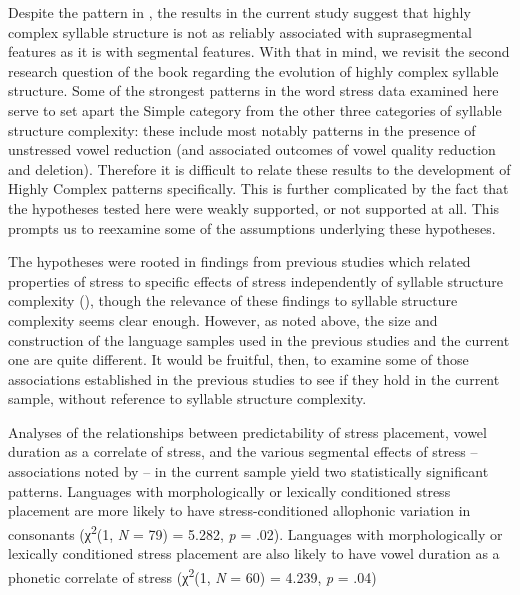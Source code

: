   Despite the pattern in , the results in the current study suggest that highly complex syllable structure is not as reliably associated with suprasegmental features as it is with segmental features. With that in mind, we revisit the second research question of the book regarding the evolution of highly complex syllable structure. Some of the strongest patterns in the word stress data examined here serve to set apart the Simple category from the other three categories of syllable structure complexity: these include most notably patterns in the presence of unstressed vowel reduction (and associated outcomes of vowel quality reduction and deletion). Therefore it is difficult to relate these results to the development of Highly Complex patterns specifically. This is further complicated by the fact that the hypotheses tested here were weakly supported, or not supported at all. This prompts us to reexamine some of the assumptions underlying these hypotheses.

  The hypotheses were rooted in findings from previous studies which related properties of stress to specific effects of stress independently of syllable structure complexity (\citealt{BybeeEtAl1998,Schiering2007}), though the relevance of these findings to syllable structure complexity seems clear enough. However, as noted above, the size and construction of the language samples used in the previous studies and the current one are quite different. It would be fruitful, then, to examine some of those associations established in the previous studies to see if they hold in the current sample, without reference to syllable structure complexity.

  Analyses of the relationships between predictability of stress placement, vowel duration as a correlate of stress, and the various segmental effects of stress -- associations noted by \citet{BybeeEtAl1998} -- in the current sample yield two statistically significant patterns. Languages with morphologically or lexically conditioned stress placement are more likely to have stress-conditioned allophonic variation in consonants (χ\textsuperscript{2}(1, \textit{N} = 79) = 5.282, \textit{p} = .02). Languages with morphologically or lexically conditioned stress placement are also likely to have vowel duration as a phonetic correlate of stress (χ\textsuperscript{2}(1, \textit{N} = 60) = 4.239, \textit{p} = .04)

